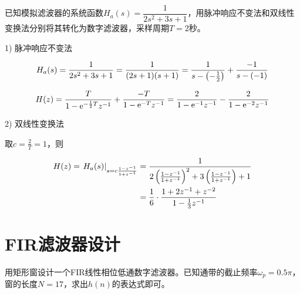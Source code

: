 \documentclass[cn, hazy, blue, normal, 14pt]{elegantnote}
\begin{document}
\begin{exercise}

已知模拟滤波器的系统函数$H_a(s)=\dfrac{1}{2s^2+3s+1}$，用脉冲响应不变法和双线性变换法分别将其转化为数字滤波器，采样周期$T=2$秒。

\end{exercise}

\begin{solution}[print=true]
    
1) 脉冲响应不变法

\begin{equation}
\notag
    H_a(s)=\frac{1}{2s^2+3s+1}=\frac{1}{(2s+1)(s+1)}=\frac{1}{s-\left(-\frac{1}{2}\right)}+\frac{-1}{s-(-1)}
\end{equation}

\begin{equation}
\notag
    H(z)=\frac{T}{1-\text{e}^{-\frac{1}{2}T}z^{-1}}+\frac{-T}{1-\text{e}^{-T}z^{-1}}=\frac{2}{1-\text{e}^{-1}z^{-1}}-\frac{2}{1-\text{e}^{-2}z^{-1}}
\end{equation}

2) 双线性变换法

取$c=\frac{2}{T}=1$，则

\begin{equation}
\notag
\begin{aligned}
    H(z)=\left.H_a(s)\right|_{s=c\frac{1-z^{-1}}{1+z^{-1}}}&=\dfrac{1}{2\left(\frac{1-z^{-1}}{1+z^{-1}}\right)^2+3\left(\frac{1-z^{-1}}{1+z^{-1}}\right)+1} \\
    &=\frac{1}{6}\cdot\frac{1+2z^{-1}+z^{-2}}{1-\frac{1}{3}z^{-1}}
\end{aligned}
\end{equation}

\end{solution}


\section{FIR滤波器设计}

\begin{exercise}

用矩形窗设计一个FIR线性相位低通数字滤波器。已知通带的截止频率$\omega_p=0.5\pi$，窗的长度$N=17$，求出$h(n)$的表达式即可。

\end{exercise}
\end{document}
